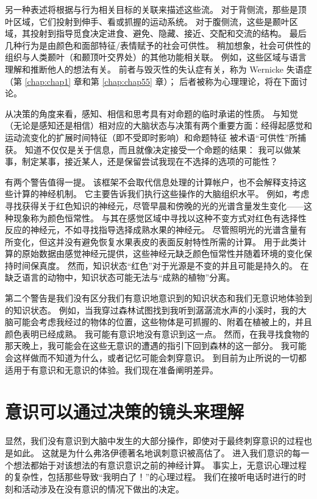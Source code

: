 另一种表述将根据与行为相关目标的关联来描述这些流。
对于背侧流，那些是顶叶区域，它们投射到伸手、看或抓握的运动系统。
对于腹侧流，这些是颞叶区域，其投射到指导觅食决定进食、避免、隐藏、接近、交配和交流的结构。
最后几种行为是由颜色和面部特征/表情赋予的社会可供性。
稍加想象，社会可供性的组织与人类颞叶（和颞顶叶交界处）的其他功能相关联。
例如，这些区域与语言理解和推断他人的想法有关。
前者与毁灭性的失认症有关，称为 Wernicke 失语症（第 \ref{chap:chap1} 章和第 \ref{chap:chap55} 章）；
后者被称为心理理论，将在下面讨论。


从决策的角度来看，感知、相信和思考具有对命题的临时承诺的性质。
与知觉（无论是感知还是相信）相对应的大脑状态与决策有两个重要方面：经得起感觉和运动流变化的扩展时间特征（即不受即时影响）和命题特征 被术语“可供性”所捕获。
知道不仅仅是关于信息，而且就像决定接受一个命题的结果：
我可以做某事，制定某事，接近某人，还是保留尝试我现在不选择的选项的可能性？


有两个警告值得一提。
该框架不会取代信息处理的计算帐户，也不会解释支持这些计算的神经机制。
它主要告诉我们执行这些操作的大脑组织水平。
例如，考虑寻找获得关于红色知识的神经元，尽管早晨和傍晚的光的光谱含量发生变化——这种现象称为颜色恒常性。
与其在感觉区域中寻找以这种不变方式对红色有选择性反应的神经元，不如寻找指导选择成熟水果的神经元。
尽管照明光的光谱含量有所变化，但这并没有避免恢复水果表皮的表面反射特性所需的计算。
用于此类计算的原始数据由感觉神经元提供，这些神经元缺乏颜色恒常性并随着环境的变化保持时间保真度。
然而，知识状态“红色”对于光源是不变的并且可能是持久的。
在缺乏语言的动物中，知识状态可能无法与“成熟的植物”分离。


第二个警告是我们没有区分我们有意识地意识到的知识状态和我们无意识地体验到的知识状态。
例如，当我穿过森林试图找到我听到潺潺流水声的小溪时，我的大脑可能会考虑我经过的物体的位置，这些物体是可抓握的、附着在植被上的，并且颜色表明已经成熟。
我可能有意识地没有意识到这一点。
然而，在我寻找食物的那天晚上，我可能会在这些无意识的遭遇的指引下回到森林的这一部分。
我可能会这样做而不知道为什么，或者记忆可能会刺穿意识。
到目前为止所说的一切都适用于有意识和无意识的体验。我们现在准备阐明差异。



\section{意识可以通过决策的镜头来理解}

显然，我们没有意识到大脑中发生的大部分操作，即使对于最终刺穿意识的过程也是如此。
这就是为什么弗洛伊德著名地讽刺意识被高估了。
进入我们意识的每一个想法都始于对该想法的有意识意识之前的神经计算。
事实上，无意识心理过程的复杂性，包括那些导致“我明白了！”的心理过程。
我们在接听电话时进行的时刻和活动涉及在没有意识的情况下做出的决定。


